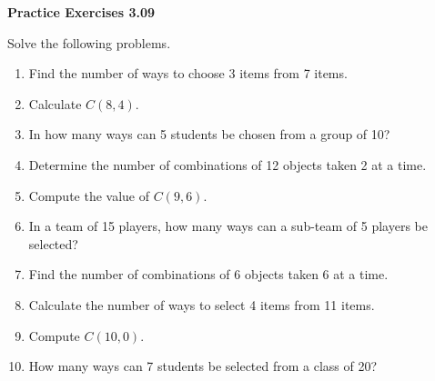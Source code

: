 \vspace{0.3ex}
\noindent\textbf{Practice Exercises 3.09}

\vspace{0.2ex}

Solve the following problems.

\begin{enumerate}[label=\color{blue}\arabic*.]
    \item Find the number of ways to choose 3 items from 7 items.
    \item Calculate \(C(8, 4)\).
    \item In how many ways can 5 students be chosen from a group of 10?
    \item Determine the number of combinations of 12 objects taken 2 at a time.
    \item Compute the value of \(C(9, 6)\).
    \item In a team of 15 players, how many ways can a sub-team of 5 players be selected?
    \item Find the number of combinations of 6 objects taken 6 at a time.
    \item Calculate the number of ways to select 4 items from 11 items.
    \item Compute \(C(10, 0)\).
    \item How many ways can 7 students be selected from a class of 20?
\end{enumerate}
